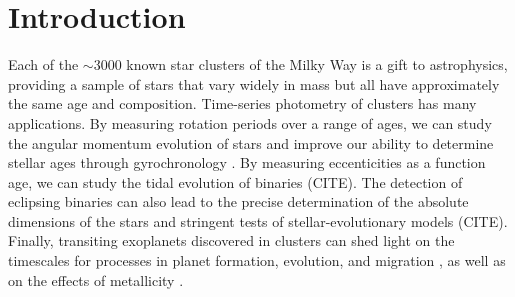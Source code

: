 \documentclass[12pt,twocolumn,tighten]{aastex62}
\begin{document}





\section{Introduction}
\label{sec:intro}

Each of the $\sim$3000 known star clusters of the Milky Way is a gift
to astrophysics, providing a sample of stars that vary widely in mass
but all have approximately the same age and composition.  Time-series
photometry of clusters has many applications. By measuring rotation
periods over a range of ages, we can study the angular momentum
evolution of stars and improve our ability
to determine stellar ages through gyrochronology \citep[{\it
e.g.},][]{skumanich_time_1972,barnes_color-period_2015,meibom_spin-down_2015,curtis_tess_2019}.
By measuring eccenticities as a function age, we can study the tidal
evolution of binaries (CITE). The detection of eclipsing binaries can
also lead to the precise determination of the absolute dimensions of
the stars and stringent tests of stellar-evolutionary models (CITE).
Finally, transiting exoplanets discovered in clusters can shed light
on the timescales for processes in planet formation, evolution, and
migration \citep[{\it
e.g.},][]{Fortney_et_al_2007,Mann_K2_33b_2016,David_et_al_2017}, as
well as on the effects of metallicity \citep[{\it
e.g.},][]{fischer_planet-metallicity_2005,petigura_metallicity_2018}.
\end{document}
